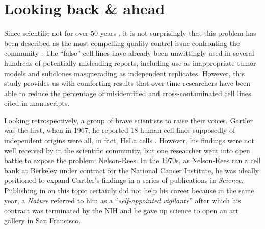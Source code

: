 \documentclass[12pt]{article}
\begin{document}
\section*{Looking back \& ahead}

Since  scientific   not  for over 50 years , it is not surprisingly that this problem has been described as the most compelling quality-control issue confronting the community \cite{nardone2008curbing}. The ``false'' cell lines have already been unwittingly used in several hundreds of potentially misleading reports, including use as inappropriate tumor models and subclones masquerading as independent replicates. However, this study provides us with comforting results that over time researchers have been able to reduce the percentage of misidentified and cross-contaminated cell lines cited in manuscripts. 



Looking retrospectively,  a group of brave scientists to raise their voices. Gartler was the first, when in 1967, he reported 18 human cell lines supposedly of independent origins were all, in fact, HeLa cells \cite{gartler1967genetic}. However, his findings were not well received by in the scientific community, but one researcher went into open battle to expose the problem: Nelson-Rees. In the 1970s, as Nelson-Rees ran a cell bank at Berkeley under contract for the National Cancer Institute, he was ideally positioned to expand Gartler's findings in a series of publications in \textit{Science}\cite{nelson1976hela, nelson1981cross, nelson1974banded}. Publishing in on this topic certainly did not help his career because in the same year, a \textit{Nature} referred to him as a ``\textit{self-appointed vigilante}'' \cite{maddox1981responsibility} after which his contract was terminated by the NIH and he gave up science to open an art gallery in San Francisco. 
\end{document}
